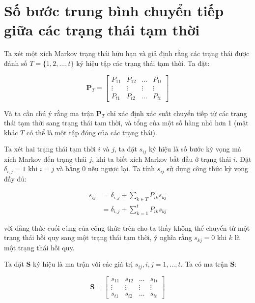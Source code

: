 \documentclass[14pt, a4paper]{article}
\numberwithin{equation}{section}
\numberwithin{figure}{section}
\theoremstyle{sltheorem}
\theoremstyle{soltheorem}
\numberwithin{dl}{section}
\numberwithin{md}{section}
\numberwithin{vd}{section}
\begin{document}
    \newpage

    \section{Số bước trung bình chuyển tiếp giữa các trạng thái tạm thời}

    Ta xét một xích Markov trạng thái hữu hạn và giả định rằng các trạng thái được đánh số $T=\lbrace 1, 2, \dots, t \rbrace$ ký hiệu tập các trạng thái tạm thời.
    Ta đặt:

    \begin{equation*}
        \mathbf{P}_T = \begin{bmatrix} P_{11} & P_{12} & \dots & P_{1t} \\ \vdots & \vdots & \vdots & \vdots \\ P_{t1} & P_{t2} & \dots & P_{tt}  \end{bmatrix}
    \end{equation*}

    Và ta cần chú ý rằng ma trận $\mathbf{P}_T$ chỉ xác định xác suất chuyển tiếp từ các trạng thái tạm thời sang trạng thái tạm thời, và tổng của một số hàng nhỏ hơn 1 (mặt khác $T$ có thể là một tập đóng của các trạng thái).
    
    Ta xét hai trạng thái tạm thời $i$ và $j$, ta đặt $s_{ij}$ ký hiệu là số bước kỳ vọng mà xích Markov đến trạng thái $j$, khi ta biết xích Markov bắt đầu ở trạng thái $i$.
    Đặt $\delta_{i,j}=1$ khi $i=j$ và bằng 0 nếu ngược lại.
    Ta tính $s_{ij}$ sử dụng công thức kỳ vọng đầy đủ:

    \begin{equation} \label{eq:expected_number_periods_i_to_j}
        \begin{aligned}
            s_{ij} &= \delta_{i,j} + \sum_{k \in T} P_{ik}s_{kj} \\
            &= \delta_{i,j} + \sum_{k=1}^t P_{ik} s_{kj}
        \end{aligned}
    \end{equation}

    với đẳng thức cuối cùng của công thức trên cho ta thấy không thể chuyển từ một trạng thái hồi quy sang một trạng thái tạm thời, ý nghĩa rằng $s_{kj}=0$ khi $k$ là một trạng thái hồi quy.

    Ta đặt $\mathbf{S}$ ký hiệu là ma trận với các giá trị $s_{ij}, i, j = 1, \dots, t$. Ta có ma trận $\mathbf{S}$:

    \begin{equation*}
        \mathbf{S} = \begin{bmatrix} s_{11} & s_{12} & \dots & s_{1t} \\ \vdots & \vdots & \vdots & \vdots \\ s_{t1} & s_{t2} & \dots & s_{tt}  \end{bmatrix}
    \end{equation*}
\end{document}

